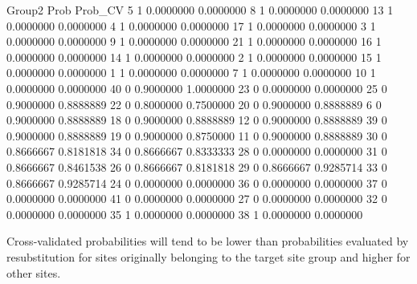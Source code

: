 \documentclass[11pt,a4paper]{article}
\begin{document}
\begin{Schunk}
\begin{Soutput}
   Group2      Prob   Prob_CV
5       1 0.0000000 0.0000000
8       1 0.0000000 0.0000000
13      1 0.0000000 0.0000000
4       1 0.0000000 0.0000000
17      1 0.0000000 0.0000000
3       1 0.0000000 0.0000000
9       1 0.0000000 0.0000000
21      1 0.0000000 0.0000000
16      1 0.0000000 0.0000000
14      1 0.0000000 0.0000000
2       1 0.0000000 0.0000000
15      1 0.0000000 0.0000000
1       1 0.0000000 0.0000000
7       1 0.0000000 0.0000000
10      1 0.0000000 0.0000000
40      0 0.9000000 1.0000000
23      0 0.0000000 0.0000000
25      0 0.9000000 0.8888889
22      0 0.8000000 0.7500000
20      0 0.9000000 0.8888889
6       0 0.9000000 0.8888889
18      0 0.9000000 0.8888889
12      0 0.9000000 0.8888889
39      0 0.9000000 0.8888889
19      0 0.9000000 0.8750000
11      0 0.9000000 0.8888889
30      0 0.8666667 0.8181818
34      0 0.8666667 0.8333333
28      0 0.0000000 0.0000000
31      0 0.8666667 0.8461538
26      0 0.8666667 0.8181818
29      0 0.8666667 0.9285714
33      0 0.8666667 0.9285714
24      0 0.0000000 0.0000000
36      0 0.0000000 0.0000000
37      0 0.0000000 0.0000000
41      0 0.0000000 0.0000000
27      0 0.0000000 0.0000000
32      0 0.0000000 0.0000000
35      1 0.0000000 0.0000000
38      1 0.0000000 0.0000000
\end{Soutput}
\end{Schunk}
Cross-validated probabilities will tend to be lower than probabilities evaluated by resubstitution for sites originally belonging to the target site group and higher for other sites.


\end{document}
